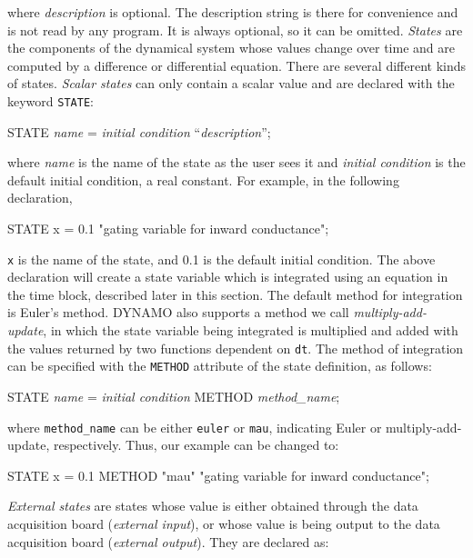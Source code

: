 where \emph{description} is optional. The description string is there for convenience and is not read by any program. It is always optional, so it can be omitted. \emph{States} are the components of the dynamical system whose values change over time and are computed by a difference or differential equation.  There are several different kinds of states. \emph{Scalar states} can only contain a scalar value and are declared with the keyword \texttt{STATE}:

\begin{example}
        STATE \emph{name} = \emph{initial condition} ``\emph{description}'';
\end{example}

where \emph{name} is the name of the state as the user sees it and \emph{initial condition} is the default initial condition, a real constant. For example, in the following declaration,

\begin{example}
        STATE x = 0.1 "gating variable for inward conductance";
\end{example}

\texttt{x} is the name of the state, and 0.1 is the default initial condition. The above declaration will create a state variable which is integrated using an equation in the time block, described later in this section. The default method for integration is Euler's method. DYNAMO also supports a method we call \emph{multiply-add-update}, in which the state variable being integrated is multiplied and added with the values returned by two functions dependent on \texttt{dt}.  The method of integration can be specified with the \texttt{METHOD} attribute of the state definition, as follows:

\begin{example}
        STATE \emph{name} = \emph{initial condition} METHOD \emph{method\_name};
\end{example}

where \texttt{method\_name} can be either \texttt{euler} or \texttt{mau}, indicating Euler or multiply-add-update, respectively. Thus, our example can be changed to:

\begin{example}
        STATE x = 0.1 METHOD "mau"  "gating variable for inward conductance";
\end{example}

\emph{External states} are states whose value is either obtained through the data acquisition board (\emph{external input}), or whose value is being output to the data acquisition board (\emph{external output}). They are declared as: 


